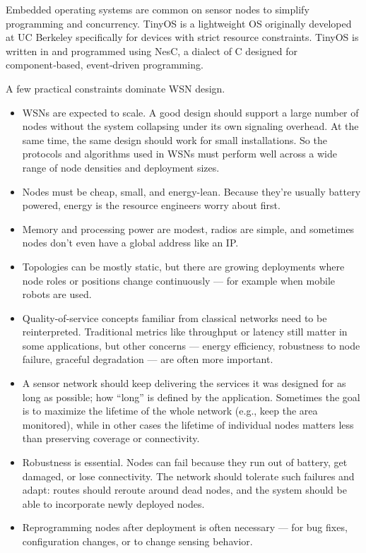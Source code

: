 Embedded operating systems are common on sensor nodes to simplify programming and concurrency. TinyOS is a lightweight OS originally developed at UC Berkeley specifically for devices with strict resource constraints. TinyOS is written in and programmed using NesC, a dialect of C designed for component‑based, event‑driven programming.

A few practical constraints dominate WSN design.
\begin{itemize}
    \item WSNs are expected to scale. A good design should support a large number of nodes without the system collapsing under its own signaling overhead. At the same time, the same design should work for small installations. So the protocols and algorithms used in WSNs must perform well across a wide range of node densities and deployment sizes.
    \item Nodes must be cheap, small, and energy-lean. Because they’re usually battery powered, energy is the resource engineers worry about first. 
    \item Memory and processing power are modest, radios are simple, and sometimes nodes don’t even have a global address like an IP. 
    \item Topologies can be mostly static, but there are growing deployments where node roles or positions change continuously — for example when mobile robots are used.
    \item Quality-of-service concepts familiar from classical networks need to be reinterpreted. Traditional metrics like throughput or latency still matter in some applications, but other concerns — energy efficiency, robustness to node failure, graceful degradation — are often more important. 
    \item A sensor network should keep delivering the services it was designed for as long as possible; how “long” is defined by the application. Sometimes the goal is to maximize the lifetime of the whole network (e.g., keep the area monitored), while in other cases the lifetime of individual nodes matters less than preserving coverage or connectivity.
    \item Robustness is essential. Nodes can fail because they run out of battery, get damaged, or lose connectivity. The network should tolerate such failures and adapt: routes should reroute around dead nodes, and the system should be able to incorporate newly deployed nodes.
    \item Reprogramming nodes after deployment is often necessary — for bug fixes, configuration changes, or to change sensing behavior. 

\end{itemize}
